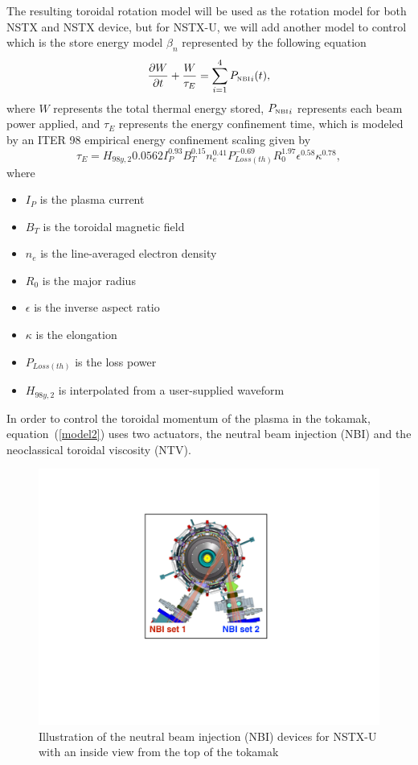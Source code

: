 \documentclass[12pt,lot, lof]{puthesis}
\begin{document}
The resulting toroidal rotation model will be used as the rotation model for both NSTX and NSTX device, but for NSTX-U, we will add another model to control which is the store energy model $\beta_n$ represented by the following equation
\begin{equation}
\frac{\partial W}{\partial t}
   + \frac{W}{\tau_E}  =\sum_{i=1}^{4}{P_\textrm{\tiny{NBI}}}_i(t),
\label{model4}
\end{equation}
where $W$ represents the total thermal energy stored, ${P_\textrm{\tiny{NBI}}}_i$ represents each beam power applied, and ${\tau_E} $ represents the energy confinement time, which is modeled by an ITER 98 empirical energy confinement scaling \cite{Iter99} given by
\begin{equation}
\tau_E = H_{98y,2} 0.0562 I_{P}^{0.93} B_{T}^{0.15} n_{e}^{0.41} P_{Loss(th)}^{-0.69} R_{0}^{1.97} {\epsilon}^{0.58} \kappa^{0.78},
\end{equation}
where
\begin{itemize}
\item $I_P$ is the plasma current
\item $B_T$ is the toroidal magnetic field
\item $n_e$ is the line-averaged electron density 
\item $R_0$ is the major radius
\item $\epsilon$ is the inverse aspect ratio
\item $\kappa$ is the elongation
\item $P_{Loss(th)}$ is the loss power
\item $H_{98y,2} $ is interpolated from a user-supplied waveform
\end{itemize}

In order to control the toroidal momentum of the plasma in the tokamak, equation~(\ref{model2}) uses two actuators, the neutral beam injection (NBI) and the neoclassical toroidal viscosity (NTV). 

\begin{figure}
\centering
\includegraphics[width=0.6\linewidth]{nnbbii}
\caption{Illustration of the neutral beam injection (NBI) devices for NSTX-U with an inside view from the top of the tokamak }
\label{figmod6}
\end{figure}
\end{document}
